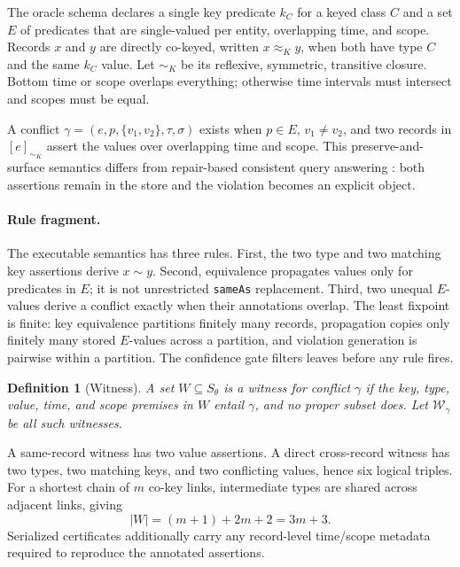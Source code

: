 \documentclass[letterpaper]{article} %
\newtheorem{definition}{Definition}
\newcommand{\W}{\mathcal{W}}
\begin{document}
The oracle schema declares a single key predicate $k_C$ for a keyed class $C$
and a set $E$ of predicates that are single-valued per entity, overlapping
time, and scope.  Records $x$ and $y$ are directly co-keyed, written
$x\approx_K y$, when both have type $C$ and the same $k_C$ value.  Let
$\sim_K$ be its reflexive, symmetric, transitive closure.  Bottom time or scope
overlaps everything; otherwise time intervals must intersect and scopes must
be equal.

A conflict $\gamma=(e,p,\{v_1,v_2\},\tau,\sigma)$ exists when $p\in E$,
$v_1\ne v_2$, and two records in $[e]_{\sim_K}$ assert the values over
overlapping time and scope.  This preserve-and-surface semantics differs from
repair-based consistent query answering \citep{arenas1999cqa}: both assertions
remain in the store and the violation becomes an explicit object.

\paragraph{Rule fragment.}
The executable semantics has three rules.  First, the two type and two matching
key assertions derive $x\sim y$.  Second, equivalence propagates values only
for predicates in $E$; it is not unrestricted \texttt{sameAs} replacement.
Third, two unequal $E$-values derive a conflict exactly when their annotations
overlap.  The least fixpoint is finite: key equivalence partitions finitely
many records, propagation copies only finitely many stored $E$-values across a
partition, and violation generation is pairwise within a partition.  The
confidence gate filters leaves before any rule fires.

\begin{definition}[Witness]
A set $W\subseteq S_\theta$ is a witness for conflict $\gamma$ if the key,
type, value, time, and scope premises in $W$ entail $\gamma$, and no proper
subset does.  Let $\W_\gamma$ be all such witnesses.
\end{definition}

A same-record witness has two value assertions.  A direct cross-record witness
has two types, two matching keys, and two conflicting values, hence six
logical triples.  For a shortest chain of $m$ co-key links, intermediate types
are shared across adjacent links, giving
\begin{equation}
  |W|=(m+1)+2m+2=3m+3. \label{eq:wsize}
\end{equation}
Serialized certificates additionally carry any record-level time/scope
metadata required to reproduce the annotated assertions.
\end{document}
